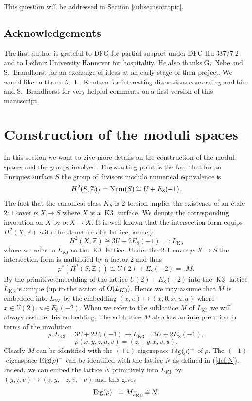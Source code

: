 \documentclass[a4paper,11pt]{article}
\newcommand{\ZZ}{\mathbb Z}
\newcommand{\Orth}{\mathop{\null\mathrm {O}}\nolimits}
\newcommand{\Num}{\mathop{\null\mathrm {Num}}\nolimits}
\newcommand{\Eig}{\mathop{\null\mathrm {Eig}}\nolimits}
\newcommand{\Kthree}{\mathop{\mathrm {K3}}\nolimits}
\begin{document}
This question will be addressed in Section \ref{subsec:isotropic}.

\subsection* {Acknowledgements} The first author is grateful to DFG for partial support under DFG Hu 337/7-2 and to Leibniz University Hannover for hospitality. He also thanks G.~Nebe and S.~Brandhorst
for an exchange of ideas at an early stage of then project.
We would like to thank A.~L.~Knutsen for interesting discussions concerning \cite{CDGK} and him and S.~Brandhorst for very helpful comments on a first version of this manuscript.

\section{Construction of the moduli spaces}\label{sec:construction}

In this section we want to give more details on the construction of the moduli spaces and the groups involved. The starting point is the fact that for an Enriques surface
$S$ the group of divisors modulo numerical equivalence is
\begin{equation*}
H^2(S,\ZZ)_f=\Num (S) \cong U + E_8(-1).
\end{equation*}
The fact that the canonical class $K_S$ is $2$-torsion implies the existence of an
\'etale $2:1$ cover $p: X \to S$ where  $X$ is a $\Kthree$ surface. We denote the corresponding involution on $X$ by $\sigma: X \to X$.
It is well known that the intersection form equips $H^2(X,\ZZ)$ with the structure of a lattice, namely
$$
H^2(X,\ZZ)\cong 3U + 2E_8(-1) =: L_{\Kthree}
$$
where we refer to $L_{\Kthree}$ as the $\Kthree$ lattice.
Under the $2:1$ cover $p: X \to S$ the intersection form is multiplied by a factor $2$
and thus
$$
p^*(H^2(S,\ZZ)) \cong U(2) + E_8(-2)=:M.
$$
By \cite[Theorem 1.14.4]{Nik} the primitive embedding of the lattice  $U(2) + E_8(-2)$ into the $\Kthree$ lattice $L_{\Kthree}$ is unique (up to the action of $\Orth(L_{K3})$.
Hence we may assume that
$M$ is embedded into $L_{\Kthree}$ by the embedding $(x,u) \mapsto (x,0,x,u,u)$ where $x\in U(2), u \in E_8(-2)$.
When we refer to the sublattice $M$ of $L_{\Kthree}$ we will always assume this embedding.
The sublattice $M$ also has an interpretation in terms of the involution
$$
\rho: L_{\Kthree}=3U + 2E_8(-1) \to L_{\Kthree}=3U + 2E_8(-1),
$$
$$
\rho(x,y,z,u,v) = (z,-y,x,v,u).
$$
Clearly $M$ can be identified with the $(+1)$-eigenspace  $\Eig(\rho)^+$ of $\rho$.
The  $(-1)$-eigenspace $\Eig(\rho)^-$ can be identified with the lattice $N$ as defined in (\ref{def:N}). Indeed, we can embed the lattice $N$ primitively into $L_{K3}$ by
$(y,z,v) \mapsto (z,y,-z,v,-v)$ and this gives
\begin{equation*}
\Eig(\rho)^-=M^{\perp}_{L_{\Kthree}}\cong N.
\end{equation*}
\end{document}
